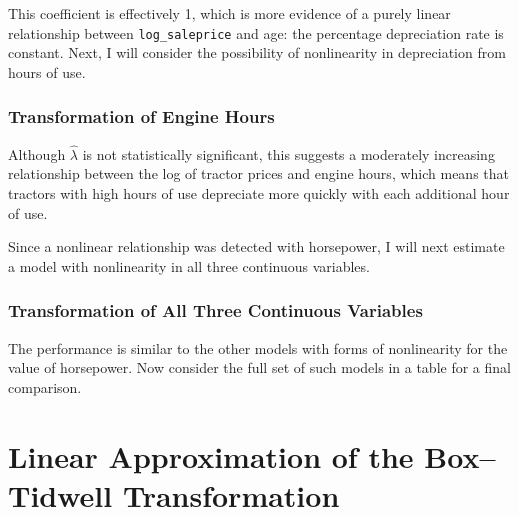 \documentclass[11pt]{paper}
\begin{document}


This coefficient is effectively 1, which is more evidence of
a purely linear relationship between \texttt{log\_saleprice}
and age: the percentage depreciation rate is constant.
Next, I will consider the possibility of nonlinearity 
in depreciation from hours of use. 

\subsubsection{Transformation of Engine Hours}




Although $\hat{\lambda}$ is not statistically significant,
this suggests a moderately increasing relationship
between the log of tractor prices and engine hours,
which means that tractors with high hours of use
depreciate more quickly with each additional hour of use.

Since a nonlinear relationship was detected with horsepower,
I will next estimate a model
with nonlinearity in all three continuous variables.


\subsubsection{Transformation of All Three Continuous Variables}





The performance is similar to the other models with
forms of nonlinearity for the value of horsepower.
Now consider the full set of such models in a table for a final comparison.



\pagebreak
\section{Linear Approximation of the Box--Tidwell Transformation}
\end{document}
